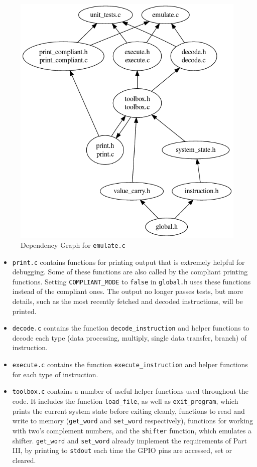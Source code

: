 \documentclass[10pt]{article}
\begin{document}
\begin{figure}[H]
\begin{minipage}{0.35\linewidth}
\centering
\includegraphics[scale=0.3]{Checkpoint/emulate.png}
\caption{Dependency Graph for \texttt{emulate.c}}

\end{minipage}
\end{figure}

\begin{itemize}
\item \texttt{print.c} contains functions for printing output that is extremely helpful for debugging. Some of these functions are also called by the compliant printing functions. Setting \texttt{COMPLIANT\_MODE} to \texttt{false} in \texttt{global.h} uses these functions instead of the compliant ones. The output no longer passes tests, but more details, such as the most recently fetched and decoded instructions, will be printed.
\item \texttt{decode.c} contains the function \texttt{decode\_instruction} and helper functions to decode each type (data processing, multiply, single data transfer, branch) of instruction.
\item \texttt{execute.c} contains the function \texttt{execute\_instruction} and helper functions for each type of instruction.
\item \texttt{toolbox.c} contains a number of useful helper functions used throughout the code. It includes the function \texttt{load\_file}, as well as \texttt{exit\_program}, which prints the current system state before exiting cleanly, functions to read and write to memory (\texttt{get\_word} and \texttt{set\_word} respectively), functions for working with two's complement numbers, and the \texttt{shifter} function, which emulates a shifter. \texttt{get\_word} and \texttt{set\_word} already implement the requirements of Part III, by printing to \texttt{stdout} each time the GPIO pins are accessed, set or cleared.
\end{itemize}
\end{document}
